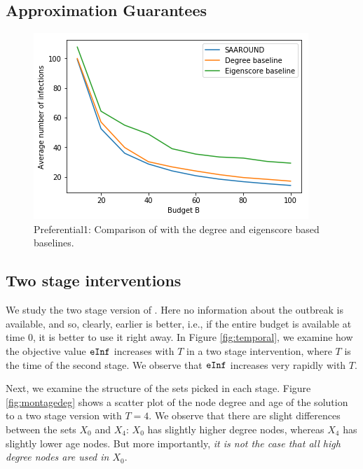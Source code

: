 \subsection{Approximation Guarantees}
\begin{figure}[!h]
    \centering
    \includegraphics[scale = 0.55]{Figuresnew/pa1_approx.png}
    \caption{Preferential1: Comparison of \algo{} with the degree and eigenscore based baselines.}
    \label{fig:pa1approx}
\end{figure}
 
 
\subsection{Two stage interventions}
We study the two stage version of \prob{}. Here no information about the outbreak is available, and so, clearly, earlier is better, i.e., if the entire budget is available at time $0$, it is better to use it right away. In Figure \ref{fig:temporal}, we examine how the objective value $\texttt{eInf}{}$ increases with $T$ in a two stage intervention, where $T$ is the time of the second stage. We observe that $\texttt{eInf}{}$ increases very rapidly with $T$.

Next, we examine the structure of the sets picked in each stage. Figure \ref{fig:montagedeg} shows a scatter plot of the node degree and age of the solution to a two stage version with $T=4$. We observe that there are slight differences between the sets $X_0$ and $X_4$: $X_0$ has slightly higher degree nodes, whereas $X_4$ has slightly lower age nodes. But more importantly, \emph{it is not the case that all high degree nodes are used in $X_0$}.

